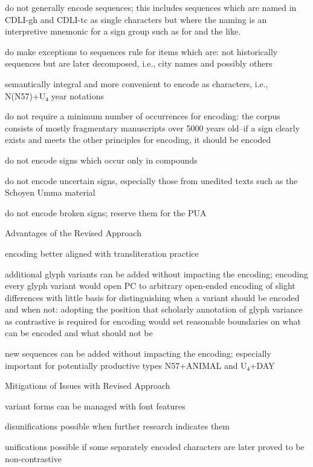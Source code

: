 \Hli{}do not generally encode sequences; this includes sequences
	which are named in CDLI-gh and CDLI-tc as single characters
	but where the naming is an interpretive mnemonic for a sign
	group such as  for  and
	the like.

\Hli{}do make exceptions to sequences rule for items which are:
	\Hul\Hli{}not historically sequences but are later decomposed, i.e., city
	  names and possibly others

\Hli{}semantically integral and more convenient to
	  encode as characters, i.e., N(N57)+U₄ year notations

\Hendul


\Hli{}do not require a minimum number of occurrences for
	encoding: the corpus consists of mostly fragmentary
	manuscripts over 5000 years old--if a sign clearly exists and
	meets the other principles for encoding, it should be
	encoded

\Hli{}do not encode signs which occur only in compounds

\Hli{}do not encode uncertain signs, especially those from
	unedited texts such as the Schoyen Umma material

\Hli{}do not encode broken signs; reserve them for the PUA

\Hendul
\Hhhh{}Advantages of the Revised Approach

\Hul\Hli{}encoding better aligned with transliteration practice

\Hli{}additional glyph variants can be added without impacting
	the encoding; encoding every glyph variant would open PC to
	arbitrary open-ended encoding of slight differences with
	little basis for distinguishing when a variant should be
	encoded and when not: adopting the position that scholarly
	annotation of glyph variance as contrastive is required for
	encoding would set reasonable boundaries on what can be
	encoded and what should not be

\Hli{}new sequences can be added without impacting the
 	encoding; especially important for potentially productive
 	types N57+ANIMAL and U₄+DAY

\Hendul
\Hhhh{}Mitigations of Issues with Revised Approach

\Hul\Hli{}variant forms can be managed with font features

\Hli{}disunifications possible when further research indicates
   	them

\Hli{}unifications possible if some separately encoded
	characters are later proved to be non-contrastive

